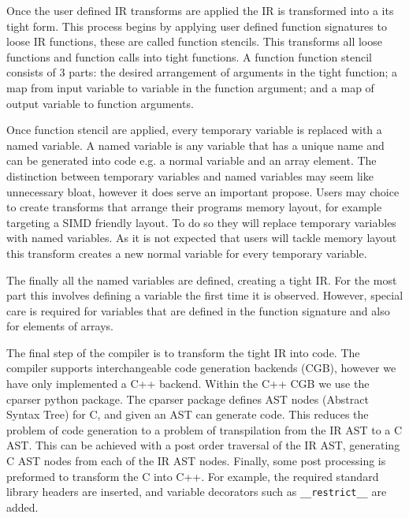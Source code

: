 Once the user defined IR transforms are applied the IR is transformed into a its tight form.
This process begins by applying user defined function signatures to loose IR functions, these are called function stencils.
This transforms all loose functions and function calls into tight functions.
A function function stencil consists of 3 parts: the desired arrangement of arguments in the tight function; a map from input variable to variable in the function argument; and a map of output variable to function arguments.

Once function stencil are applied, every temporary variable is replaced with a named variable.
A named variable is any variable that has a unique name and can be generated into code e.g. a normal variable and an array element.
The distinction between temporary variables and named variables may seem like unnecessary bloat, however it does serve an important propose.
Users may choice to create transforms that arrange their programs memory layout, for example targeting a SIMD friendly layout.
To do so they will replace temporary variables with named variables.
As it is not expected that users will tackle memory layout this transform creates a new normal variable for every temporary variable. 

The finally all the named variables are defined, creating a tight IR.
For the most part this involves defining a variable the first time it is observed.
However, special care is required for variables that are defined in the function signature and also for elements of arrays.

The final step of the compiler is to transform the tight IR into code.
The compiler supports interchangeable code generation backends (CGB), however we have only implemented a C++ backend.
Within the C++ CGB we use the cparser python package.
The cparser package defines AST nodes (Abstract Syntax Tree) for C, and given an AST can generate code.
This reduces the problem of code generation to a problem of transpilation from the IR AST to a C AST.
This can be achieved with a post order traversal of the IR AST, generating C AST nodes from each of the IR AST nodes.
Finally, some post processing is preformed to transform the C into C++.
For example, the required standard library headers are inserted, and variable decorators such as \lstinline{__restrict__} are added.  